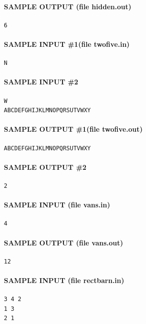 \documentclass[11pt]{article}
\begin{document}
\paragraph{SAMPLE OUTPUT (file hidden.out)}
\begin{verbatim}
6
\end{verbatim}

\paragraph{SAMPLE INPUT \#1(file twofive.in)}
\begin{verbatim}
N
\end{verbatim}

\paragraph{SAMPLE INPUT \#2}
\begin{verbatim}
W
ABCDEFGHIJKLMNOPQRSUTVWXY
\end{verbatim}

\paragraph{SAMPLE OUTPUT \#1(file twofive.out)}
\begin{verbatim}
ABCDEFGHIJKLMNOPQRSUTVWXY
\end{verbatim}

\paragraph{SAMPLE OUTPUT \#2}
\begin{verbatim}
2
\end{verbatim}

\paragraph{SAMPLE INPUT (file vans.in)}
\begin{verbatim}
4
\end{verbatim}

\paragraph{SAMPLE OUTPUT (file vans.out)}
\begin{verbatim}
12
\end{verbatim}

\paragraph{SAMPLE INPUT (file rectbarn.in)}
\begin{verbatim}
3 4 2
1 3
2 1
\end{verbatim}
\end{document}
